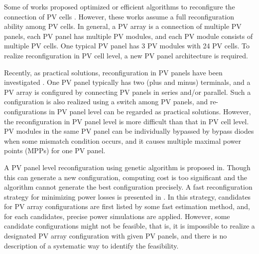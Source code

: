 \documentclass[conference]{IEEEtran}
\begin{document}
Some of works proposed optimized or efficient algorithms to reconfigure the connection of PV cells \cite{b3}\cite{b4}. However, these works assume a full reconfiguration ability among PV cells. In general, a PV array is a connection of multiple PV panels, each PV panel has multiple PV modules, and each PV module consists of multiple PV cells. One typical PV panel has 3 PV modules with 24 PV cells. To realize reconfiguration in PV cell level, a new PV panel architecture is required.

Recently, as practical solutions, reconfiguration in PV panels have been investigated \cite{b5}\cite{b10}. One PV panel typically has two (plus and minus) terminals, and a PV array is configured by connecting PV panels in series and/or parallel. Such a configuration is also realized using a switch among PV panels, and re-configurations in PV panel level can be regarded as  practical solutions. However, the reconfiguration in PV panel level is more difficult than that in PV cell level. PV modules in the same PV panel can be individually bypassed by bypass diodes when some mismatch condition occurs, and it causes multiple maximal power points (MPPs) for one PV panel.  

A PV panel level reconfiguration using genetic algorithm is proposed in\cite{b5}. Though this can generate a new configuration, 
computing cost is too significant and the algorithm cannot generate the best configuration precisely. A fast reconfiguration
strategy for minimizing power losses is presented in \cite{b10}.
In this strategy, candidates for PV array configurations are first listed by some fast estimation method, and, for each candidates, precise power simulations are applied. However, some candidate configurations might not be feasible, that is, it is impossible to realize a designated PV array configuration with given PV panels, and there is no description of a systematic way to identify the feasibility. 
\end{document}
